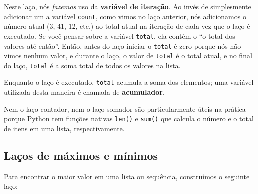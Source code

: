 Neste laço, nós \emph{fazemos} uso da {\bf variável de iteração}. Ao invés de
simplesmente adicionar um a variável {\tt count}, como vimos no laço anterior,
nós adicionamos o número atual (3, 41, 12, etc.) ao total atual na iteração
de cada vez que o laço é executado. Se você pensar sobre a variável
{\tt total}, ela contém o ``o total dos valores até então''. Então, antes do
laço iniciar o {\tt total} é zero porque nós não vimos nenhum valor, e durante
o laço, o valor de {\tt total} é o total atual, e no final do laço, {\tt total}
é a soma total de todos os valores na lista.


Enquanto o laço é executado, {\tt total} acumula a soma dos elementos; uma
variável utilizada desta maneira é chamada de {\bf acumulador}.


Nem o laço contador, nem o laço somador são particularmente úteis na prática
porque Python tem funções nativas {\tt len()} e {\tt sum()} que calcula o
número e o total de itens em uma lista, respectivamente.

\subsection{Laços de máximos e mínimos}

\label{maximumloop}


Para encontrar o maior valor em uma lista ou sequência, construímos o seguinte
laço:

